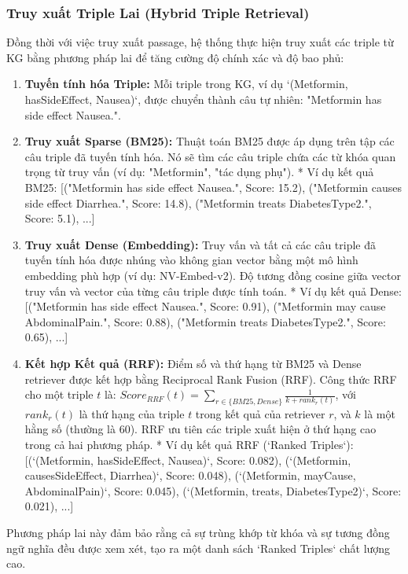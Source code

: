 \documentclass[../main.tex]{subfiles}
\begin{document}
\subsubsection{Truy xuất Triple Lai (Hybrid Triple Retrieval)}

Đồng thời với việc truy xuất passage, hệ thống thực hiện truy xuất các triple từ KG bằng phương pháp lai để tăng cường độ chính xác và độ bao phủ:

\begin{enumerate}
    \item \textbf{Tuyến tính hóa Triple:} Mỗi triple trong KG, ví dụ `(Metformin, hasSideEffect, Nausea)`, được chuyển thành câu tự nhiên: "Metformin has side effect Nausea.".
    \item \textbf{Truy xuất Sparse (BM25):} Thuật toán BM25 được áp dụng trên tập các câu triple đã tuyến tính hóa. Nó sẽ tìm các câu triple chứa các từ khóa quan trọng từ truy vấn (ví dụ: "Metformin", "tác dụng phụ").
        *   Ví dụ kết quả BM25: [("Metformin has side effect Nausea.", Score: 15.2), ("Metformin causes side effect Diarrhea.", Score: 14.8), ("Metformin treats DiabetesType2.", Score: 5.1), ...]
    \item \textbf{Truy xuất Dense (Embedding):} Truy vấn và tất cả các câu triple đã tuyến tính hóa được nhúng vào không gian vector bằng một mô hình embedding phù hợp (ví dụ: NV-Embed-v2). Độ tương đồng cosine giữa vector truy vấn và vector của từng câu triple được tính toán.
        *   Ví dụ kết quả Dense: [("Metformin has side effect Nausea.", Score: 0.91), ("Metformin may cause AbdominalPain.", Score: 0.88), ("Metformin treats DiabetesType2.", Score: 0.65), ...]
    \item \textbf{Kết hợp Kết quả (RRF):} Điểm số và thứ hạng từ BM25 và Dense retriever được kết hợp bằng Reciprocal Rank Fusion (RRF). Công thức RRF cho một triple $t$ là: $Score_{RRF}(t) = \sum_{r \in \{BM25, Dense\}} \frac{1}{k + rank_r(t)}$, với $rank_r(t)$ là thứ hạng của triple $t$ trong kết quả của retriever $r$, và $k$ là một hằng số (thường là 60). RRF ưu tiên các triple xuất hiện ở thứ hạng cao trong cả hai phương pháp.
        *   Ví dụ kết quả RRF (`Ranked Triples`): [(`(Metformin, hasSideEffect, Nausea)`, Score: 0.082), (`(Metformin, causesSideEffect, Diarrhea)`, Score: 0.048), (`(Metformin, mayCause, AbdominalPain)`, Score: 0.045), (`(Metformin, treats, DiabetesType2)`, Score: 0.021), ...]
\end{enumerate}
Phương pháp lai này đảm bảo rằng cả sự trùng khớp từ khóa và sự tương đồng ngữ nghĩa đều được xem xét, tạo ra một danh sách `Ranked Triples` chất lượng cao.
\end{document}
